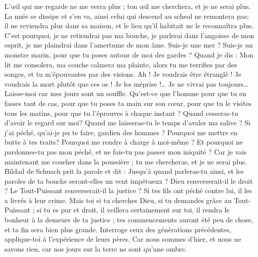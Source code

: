 \begin{multicols}{2}
L'œil qui me regarde ne me verra plus ; ton œil me cherchera, et je ne serai plus.
La nuée se dissipe et s'en va, ainsi celui qui descend au scheol ne remontera pas;
il ne reviendra plus dans sa maison, et le lieu qu'il habitait ne le reconnaîtra plus.
C'est pourquoi, je ne retiendrai pas ma bouche, je parlerai dans l'angoisse de mon esprit, je me plaindrai dans l'amertume de mon âme.
Suis-je une mer ? Suis-je un monstre marin, pour que tu poses autour de moi des gardes ?
Quand je dis : Mon lit me consolera, ma couche calmera ma plainte,
alors tu me terrifies par des songes, et tu m'épouvantes par des visions.
Ah ! Je voudrais être étranglé ! Je voudrais la mort plutôt que ces os !
Je les méprise !… Je ne vivrai pas toujours… Laisse-moi car mes jours sont un souffle.
Qu'est-ce que l'homme pour que tu en fasses tant de cas, pour que tu poses ta main sur son cœur,
pour que tu le visites tous les matins, pour que tu l'éprouves à chaque instant ?
Quand cesseras-tu d'avoir le regard sur moi? Quand me laisseras-tu le temps d'avaler ma salive ?
Si j'ai péché, qu'ai-je pu te faire, gardien des hommes ? Pourquoi me mettre en butte à tes traits? Pourquoi me rendre à charge à moi-même ?
Et pourquoi ne pardonnes-tu pas mon péché, et ne fais-tu pas passer mon iniquité ? Car je vais maintenant me coucher dans la poussière ; tu me chercheras, et je ne serai plus.
\VerseOne{}Bildad de Schuach prit la parole et dit :
Jusqu'à quand parleras-tu ainsi, et les paroles de ta bouche seront-elles un vent impétueux ?
Dieu renverserait-il le droit ? Le Tout-Puissant renverserait-il la justice ?
Si tes fils ont péché contre lui, il les a livrés à leur crime.
Mais toi si tu cherches Dieu, si tu demandes grâce au Tout-Puissant ;
si tu es pur et droit, il veillera certainement sur toi, il rendra le bonheur à la demeure de ta justice ;
tes commencements auront été peu de chose, et ta fin sera bien plus grande.
Interroge ceux des générations précédentes, applique-toi à l'expérience de leurs pères.
Car nous sommes d'hier, et nous ne savons rien, car nos jours sur la terre ne sont qu'une ombre.

\end{multicols}
